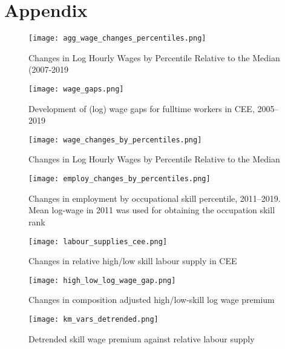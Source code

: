 \documentclass{article}
\begin{document}
\newpage

\section{Appendix}

\begin{figure}[!htbp]%
    \centering
    {\texttt{[image: agg\_wage\_changes\_percentiles.png]} }
    \caption{Changes in Log Hourly Wages by Percentile Relative to the Median (2007-2019}
    \label{agg_wage_changes_percentiles}
\end{figure}



\begin{figure}[!htbp]%
    \centering
    {\texttt{[image: wage\_gaps.png]} }
    \caption{Development of (log) wage gaps for fulltime workers in CEE, 2005–2019}
    \label{wage_gaps_CEE}
\end{figure}

\begin{figure}[!htbp]%
    \centering
    {\texttt{[image: wage\_changes\_by\_percentiles.png]} }
    \caption{Changes in Log Hourly Wages by Percentile Relative to the Median}
    \label{wage_changes_percentiles}
\end{figure}

\begin{figure}[!htbp]%
    \centering
    {\texttt{[image: employ\_changes\_by\_percentiles.png]} }
    \caption{Changes in employment by occupational skill percentile, 2011–2019. Mean log-wage in 2011 was used for obtaining the occupation skill rank}
    \label{employ_changes_percentiles}
\end{figure}

\begin{figure}[!htbp]%
        \centering 
        {\texttt{[image: labour\_supplies\_cee.png]}}
        \caption{Changes in relative high/low skill labour supply in CEE}
        \label{labour_supplies_cee}
\end{figure}

\begin{figure}[!htbp]%
    \centering 
    {\texttt{[image: high\_low\_log\_wage\_gap.png]}}
    \caption{Changes in composition adjusted high/low-skill log wage premium}
    \label{high_low_log_wage_gap}
\end{figure}


\begin{figure}[!htbp]%
    \centering
    {\texttt{[image: km\_vars\_detrended.png]} }
    \caption{Detrended skill wage premium against relative labour supply}
    \label{km_vars_detrended}
\end{figure}
\end{document}
